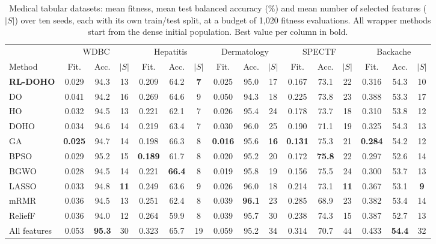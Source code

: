 \documentclass[journal]{IEEEtran}
\begin{document}
\begin{table}[t]
\centering
\caption{Medical tabular datasets: mean fitness, mean test balanced accuracy (\%) and mean number of selected features ($|S|$) over ten seeds, each with its own train/test split, at a budget of 1,020 fitness evaluations. All wrapper methods start from the dense initial population. Best value per column in bold.}
\label{tab:tab}
\footnotesize
\setlength{\tabcolsep}{3.2pt}
\begin{tabular}{@{}l ccc ccc ccc ccc ccc@{}}
\toprule
& \multicolumn{3}{c}{WDBC} & \multicolumn{3}{c}{Hepatitis} & \multicolumn{3}{c}{Dermatology} & \multicolumn{3}{c}{SPECTF} & \multicolumn{3}{c}{Backache} \\
\cmidrule(lr){2-4}\cmidrule(lr){5-7}\cmidrule(lr){8-10}\cmidrule(lr){11-13}\cmidrule(l){14-16}
Method & Fit. & Acc. & $|S|$ & Fit. & Acc. & $|S|$ & Fit. & Acc. & $|S|$ & Fit. & Acc. & $|S|$ & Fit. & Acc. & $|S|$ \\
\midrule
\textbf{RL-DOHO} & 0.029 & 94.3 & 13 & 0.209 & 64.2 & \textbf{7} & 0.025 & 95.0 & 17 & 0.167 & 73.1 & 22 & 0.316 & 54.3 & 10 \\
DO & 0.041 & 94.2 & 16 & 0.269 & 64.6 & 9 & 0.050 & 94.3 & 18 & 0.225 & 73.8 & 23 & 0.388 & 53.3 & 17 \\
HO & 0.032 & 94.5 & 13 & 0.221 & 62.1 & 7 & 0.026 & 95.4 & 24 & 0.178 & 73.7 & 18 & 0.310 & 53.8 & 12 \\
DOHO & 0.034 & 94.6 & 14 & 0.219 & 63.4 & 7 & 0.030 & 96.0 & 25 & 0.190 & 71.1 & 19 & 0.325 & 54.3 & 13 \\
\midrule
GA & \textbf{0.025} & 94.7 & 14 & 0.198 & 66.3 & 8 & \textbf{0.016} & 95.6 & \textbf{16} & \textbf{0.131} & 75.3 & 21 & \textbf{0.284} & 54.2 & 12 \\
BPSO & 0.029 & 95.2 & 15 & \textbf{0.189} & 61.7 & 8 & 0.020 & 95.2 & 20 & 0.172 & \textbf{75.8} & 22 & 0.297 & 52.6 & 14 \\
BGWO & 0.028 & 94.5 & 14 & 0.221 & \textbf{66.4} & 8 & 0.019 & 95.8 & 19 & 0.156 & 75.5 & 24 & 0.300 & 53.7 & 13 \\
\midrule
LASSO & 0.033 & 94.8 & \textbf{11} & 0.249 & 63.6 & 9 & 0.026 & 96.0 & 18 & 0.214 & 73.1 & \textbf{11} & 0.367 & 53.1 & \textbf{9} \\
mRMR & 0.036 & 94.5 & 13 & 0.251 & 62.4 & 8 & 0.039 & \textbf{96.1} & 23 & 0.285 & 68.9 & 23 & 0.382 & 53.4 & 14 \\
ReliefF & 0.036 & 94.0 & 12 & 0.264 & 59.9 & 8 & 0.039 & 95.7 & 30 & 0.238 & 74.3 & 15 & 0.387 & 52.7 & 13 \\
All features & 0.053 & \textbf{95.3} & 30 & 0.323 & 65.7 & 19 & 0.059 & 95.2 & 34 & 0.314 & 70.7 & 44 & 0.433 & \textbf{54.4} & 32 \\
\bottomrule
\end{tabular}
\end{table}
\end{document}
